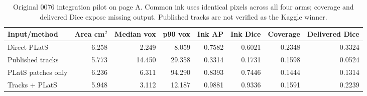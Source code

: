 \begin{table}[t]
\centering
\small
\setlength{\tabcolsep}{4pt}
\begin{tabular}{lrrrrrrr}
\toprule
Input/method & Area cm$^2$ & Median vox & p90 vox & Ink AP & Ink Dice & Coverage & Delivered Dice \\
\midrule
Direct PLatS & 6.258 & 2.249 & 8.059 & 0.7582 & 0.6021 & 0.2348 & 0.3324 \\
Published tracks & 5.773 & 14.450 & 29.358 & 0.3314 & 0.1731 & 0.1598 & 0.0524 \\
PLatS patches only & 6.236 & 6.311 & 94.290 & 0.8393 & 0.7446 & 0.1444 & 0.1314 \\
Tracks + PLatS & 5.948 & 3.112 & 12.187 & 0.9881 & 0.9336 & 0.1591 & 0.2239 \\
\bottomrule
\end{tabular}
\caption{Original 0076 integration pilot on page A. Common ink uses identical pixels across all four arms; coverage and delivered Dice expose missing output. Published tracks are not verified as the Kaggle winner.}
\label{tab:spiralintegration}
\end{table}
